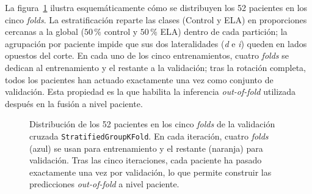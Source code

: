\documentclass[12pt]{extarticle}
\numberwithin{equation}{section}
\begin{document}
\begin{refsection}
La figura~\ref{fig:kfold-schema} ilustra esquemáticamente cómo se distribuyen los 52 pacientes en los cinco \textit{folds}. La estratificación reparte las clases (Control y ELA) en proporciones cercanas a la global ($50$\,\% control y $50$\,\% ELA) dentro de cada partición; la agrupación por paciente impide que sus dos lateralidades (\textit{d} e \textit{i}) queden en lados opuestos del corte. En cada uno de los cinco entrenamientos, cuatro \textit{folds} se dedican al entrenamiento y el restante a la validación; tras la rotación completa, todos los pacientes han actuado exactamente una vez como conjunto de validación. Esta propiedad es la que habilita la inferencia \textit{out-of-fold} utilizada después en la fusión a nivel paciente.

\begin{figure}[H]
\centering
{}
\caption{Distribución de los 52 pacientes en los cinco \textit{folds} de la validación cruzada \texttt{Stratified\allowbreak Group\allowbreak KFold}. En cada iteración, cuatro \textit{folds} (azul) se usan para entrenamiento y el restante (naranja) para validación. Tras las cinco iteraciones, cada paciente ha pasado exactamente una vez por validación, lo que permite construir las predicciones \textit{out-of-fold} a nivel paciente.}
\label{fig:kfold-schema}
\end{figure}


\end{refsection}
\end{document}
